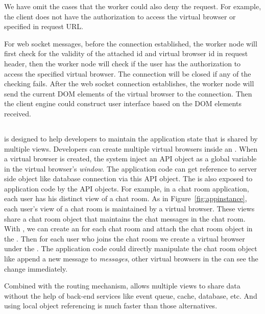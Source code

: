 We have omit the cases that the worker could also deny the request.
For example, 
the client does not have the authorization to access the virtual browser or \appins{} specified
in request URL.

For web socket messages, 
before the connection established,
the worker node will first check for the validity of the attached
 \appins{} id and virtual browser id in request header,
then the worker node will check if the user has the authorization to access
the specified virtual browser.
The connection will be closed if any of the checking fails.
After the web socket connection establishes,
the worker node will send the current DOM elements of the virtual browser 
to the connection.
Then the client engine could construct user interface based on the DOM elements received.

\appinstancefig{}

\subsection{\appins{}}
\label{sec:appins}
\appins{} is designed to help developers to maintain 
the application state that is shared by multiple views.
Developers can create multiple virtual browsers inside
an \appins{}.
When a virtual browser is created,
the system inject an API object as a global variable 
in the virtual browser's \emph{window}.
The application code can get reference to server side
object like database connection via this API object.
The \appins{} is also exposed to application code by the API objects.
For example, in a chat room application,
each user has his distinct view of a chat room.
As in Figure~\ref{fig:appinstance}, 
each user's view of a chat room is maintained by a virtual browser.
These views share a chat room object that maintains the chat messages
in the chat room.
With \appins{}, we can create an \appins{} for each chat room
and attach the chat room object in the \appins{}.
Then for each user who joins the chat room we create a virtual browser
under the \appins{}.
The application code could directly manipulate the chat room object
like append a new message to \emph{messages},
other virtual browsers in the \appins{} can see the change immediately.

Combined with the routing mechanism,
\appins{} allows multiple views to share data without the help
of back-end services like event queue, cache, database, etc.
And using local object referencing is much faster than those alternatives.


